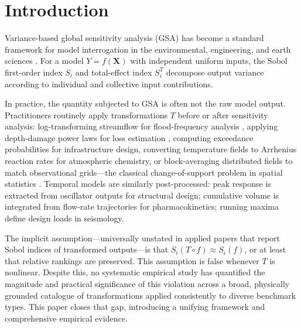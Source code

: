 \documentclass[11pt,onecolumn]{article}
\begin{document}
\tableofcontents
\clearpage

\section{Introduction}
\label{sec:intro}

Variance-based global sensitivity analysis (GSA) has become a standard
framework for model interrogation in the environmental, engineering, and earth
sciences \citep{Saltelli2008,IoossLemaitre2015,Razavi2021}. For a model
$Y = f(\mathbf{X})$ with independent uniform inputs, the Sobol first-order
index $S_i$ and total-effect index $S_i^T$ decompose output variance according
to individual and collective input contributions.

In practice, the quantity subjected to GSA is often not the raw model output.
Practitioners routinely apply transformations $T$ before or after sensitivity
analysis: log-transforming streamflow for flood-frequency analysis
\citep{Vogel1996}, applying depth-damage power laws for loss estimation
\citep{Merz2010}, computing exceedance probabilities for infrastructure design,
converting temperature fields to Arrhenius reaction rates for atmospheric
chemistry, or block-averaging distributed fields to match observational grids---the
classical change-of-support problem in spatial statistics
\citep{Cressie1993,GotwayYoung2002}. Temporal models are similarly post-processed: peak
response is extracted from oscillator outputs for structural design; cumulative
volume is integrated from flow-rate trajectories for pharmacokinetics; running
maxima define design loads in seismology.

The implicit assumption---universally unstated in applied papers that report
Sobol indices of transformed outputs---is that
$S_i(T \circ f) \approx S_i(f)$, or at least that relative rankings are preserved.
This assumption is false whenever $T$ is nonlinear.
Despite this, no systematic empirical study has quantified the magnitude and
practical significance of this violation across a broad, physically grounded
catalogue of transformations applied consistently to diverse benchmark types.
This paper closes that gap, introducing a unifying framework and comprehensive
empirical evidence.
\end{document}
